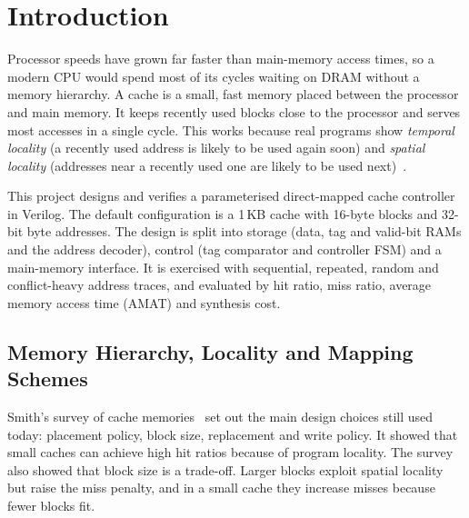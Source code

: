 %

\section{Introduction}
Processor speeds have grown far faster than main-memory access times, so a
modern CPU would spend most of its cycles waiting on DRAM without a memory
hierarchy. A cache is a small, fast memory placed between the processor and
main memory. It keeps recently used blocks close to the processor and serves
most accesses in a single cycle. This works because real programs show
\emph{temporal locality} (a recently used address is likely to be used again
soon) and \emph{spatial locality} (addresses near a recently used one are
likely to be used next)~\cite{smith1982,hennessy2017}.

This project designs and verifies a parameterised direct-mapped cache
controller in Verilog. The default configuration is a 1\,KB cache with
16-byte blocks and 32-bit byte addresses. The design is split into storage
(data, tag and valid-bit RAMs and the address decoder), control (tag
comparator and controller FSM) and a main-memory interface. It is exercised
with sequential, repeated, random and conflict-heavy address traces, and
evaluated by hit ratio, miss ratio, average memory access time (AMAT) and
synthesis cost.


\subsection{Memory Hierarchy, Locality and Mapping Schemes}
Smith's survey of cache memories~\cite{smith1982} set out the main design
choices still used today: placement policy, block size, replacement and write
policy. It showed that small caches can achieve high hit ratios because of
program locality. The survey also showed that block size is a trade-off.
Larger blocks exploit spatial locality but raise the miss penalty, and in a
small cache they increase misses because fewer blocks fit.

